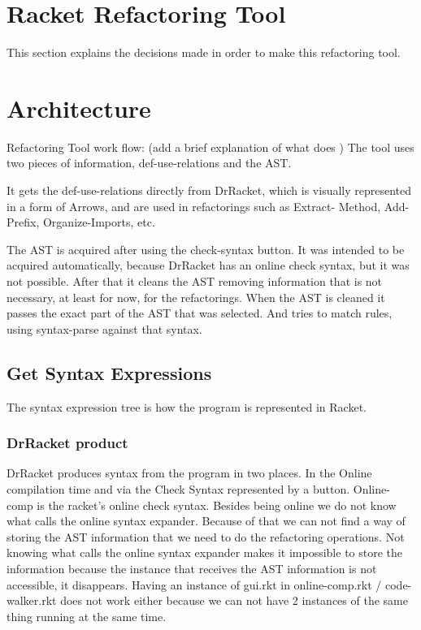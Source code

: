 \section{Racket Refactoring Tool}
This section explains the decisions made in order to make this refactoring tool.

\section{Architecture}
Refactoring Tool work flow: (add a brief explanation of what does )
The tool uses two pieces of information, def-use-relations and the AST.

It gets the def-use-relations directly from DrRacket, which is visually
represented in a form of Arrows, and are used in refactorings such as Extract-
Method, Add-Prefix, Organize-Imports, etc.

The AST is acquired after using the check-syntax button. It was intended to be
acquired automatically, because DrRacket has an online check syntax, but it was
not possible. After that it cleans the AST removing information that is not
necessary, at least for now, for the refactorings. When the AST is cleaned it
passes the exact part of the AST that was selected. And tries to match rules,
using syntax-parse against that syntax.

\subsection{Get Syntax Expressions}
The syntax expression tree is how the program is represented in Racket.

\subsubsection{DrRacket product}
DrRacket produces syntax from the program in two places.
In the Online compilation time and via the Check Syntax represented by a button.
Online-comp is the racket's online check syntax.
Besides being online we do not know what calls the online syntax expander.
Because of that we can not find a way of storing the AST information that we
need to do the refactoring operations.
Not knowing what calls the online syntax expander makes it impossible to store
the information because the instance that receives the AST information is not
accessible, it disappears.
Having an instance of gui.rkt in
online-comp.rkt / code-walker.rkt does not work either because we can not have 2
instances of the same thing running at the same time.


